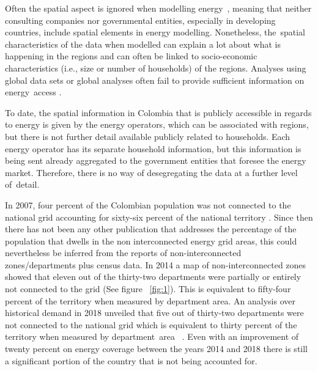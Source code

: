 \documentclass[energies,article,accept,pdftex,moreauthors]{Definitions/mdpi}
\begin{document}
 Often the spatial aspect  is ignored when modelling energy~\citep{Meier2019Short-termModels}, meaning that  neither consulting companies nor governmental entities, especially in developing countries, include spatial  elements  in energy modelling. Nonetheless, the~spatial characteristics of the data when modelled can explain a lot about what is happening in the regions and can often be  linked to socio-economic characteristics (i.e., size or number of households) of the regions. Analyses using global data sets or global analyses often fail to provide sufficient information on energy~access \citep{WHO2009TheCountries}. %
 

 To date, the spatial information in Colombia that is publicly accessible in regards to energy is given by the energy operators, which can be associated with regions, but there is not further detail available publicly related to households. Each energy operator has its separate household information, but this information is being sent already aggregated to the government entities that foresee the energy market. Therefore, there is no way of desegregating the data at a further level of~detail. 


In 2007, four percent of the Colombian population was not connected to the national grid accounting for sixty-six percent of the national territory \citep{Franco2007ContributionSouthwest}. Since then there has not been any other publication that addresses the percentage of the population that dwells in the non interconnected energy grid areas,  this could nevertheless be inferred from the reports of non-interconnected zones/departments plus census data. In 2014 a map of non-interconnected zones showed that eleven out of the thirty-two departments were partially or entirely not connected to the grid\citep{BustosGonzalez2014NonPerspectives} (See figure ~\ref{fig:1}). This is equivalent to fifty-four percent of the territory when measured by department area. An analysis over historical demand in 2018 unveiled that five out of thirty-two departments were not connected to the national grid which is equivalent to thirty percent of the territory when measured by department~area ~\citep{XMHistoricalDemand}. Even with an improvement of twenty percent on energy coverage between the years 2014 and 2018 there is still a significant portion of the country that is not being accounted for.
\end{document}
